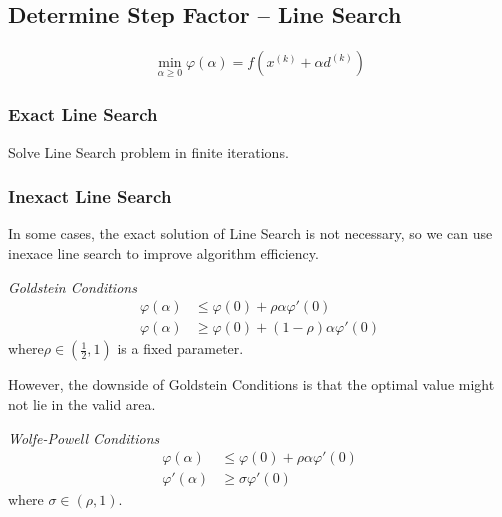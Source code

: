 \subsection{Determine Step Factor -- Line Search}

\begin{align}
    \min_{\alpha \geq 0} \varphi(\alpha) = f(x^{(k)} + \alpha d^{(k)})
\end{align}
\subsubsection{Exact Line Search}
\par
Solve Line Search problem in finite iterations.
\par
\subsubsection{Inexact Line Search}
\par
In some cases, the exact solution of Line Search
is not necessary, so we can use inexace line search
to improve algorithm efficiency.
\par
\noindent\textit{Goldstein Conditions}
\begin{align}
    \varphi(\alpha) &\leq \varphi(0) + \rho\alpha\varphi'(0) \\
    \varphi(\alpha) &\geq \varphi(0) + (1 - \rho)\alpha\varphi'(0)
\end{align}
where$\rho \in (\frac{1}{2}, 1)$ is a fixed parameter.
\par
However, the downside of Goldstein Conditions
is that the optimal value might not lie in
the valid area.
\par\noindent\textit{Wolfe-Powell Conditions}
\begin{align}
    \varphi(\alpha) &\leq \varphi(0) + \rho\alpha\varphi'(0) \\
    \varphi'(\alpha) &\geq \sigma\varphi'(0)
\end{align}
where $\sigma \in (\rho, 1)$.

